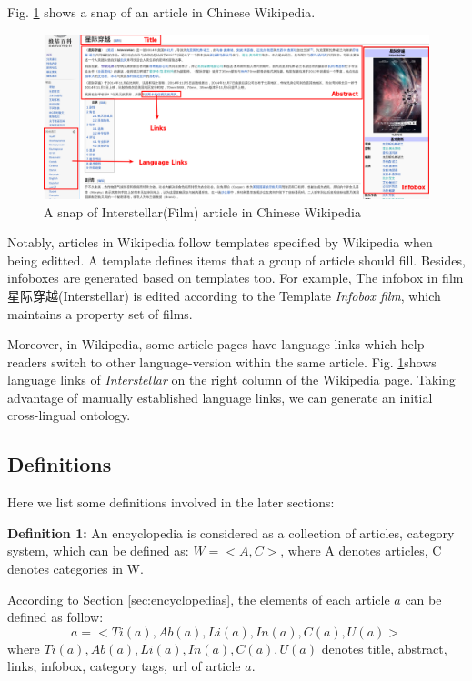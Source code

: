 \documentclass[runningheads,a4paper]{llncs}
\begin{document}
Fig. \ref{fig:interstellar} shows a snap of an article in Chinese Wikipedia.
\begin{figure}[ht]
    \centerline{\includegraphics[width=1\columnwidth]{fig/interstellar}}
    \caption{A snap of Interstellar(Film) article in Chinese Wikipedia}
    \label{fig:interstellar}
\end{figure}%

Notably, articles in Wikipedia follow templates specified by Wikipedia when being editted. A template defines items that a group of article should fill. Besides, infoboxes are generated based on templates too. For example, The infobox in film 星际穿越(Interstellar) is edited according to the Template \emph{Infobox film}, which maintains a property set of films.

Moreover, in Wikipedia, some article pages have language links which help readers switch to other language-version within the same article. Fig. \ref{fig:interstellar}shows language links of \emph{Interstellar} on the right column of the Wikipedia page. Taking advantage of manually established language links, we can generate an initial cross-lingual ontology.

\subsection{Definitions}
\label{sec:definition}
Here we list some definitions involved in the later sections:

\textbf{Definition 1:} An encyclopedia is considered as a collection of articles, category system, which can be defined as: $W = <A,C>$, where A denotes articles, C denotes categories in W.

According to Section \ref{sec:encyclopedias}, the elements of each article $a$ can be defined as follow:
\begin{equation}
    a = <Ti(a),Ab(a),Li(a),In(a),C(a),U(a)>
\end{equation}
where $Ti(a),Ab(a),Li(a),In(a),C(a),U(a)$ denotes title, abstract, links, infobox, category tags, url of article $a$.
\end{document}

